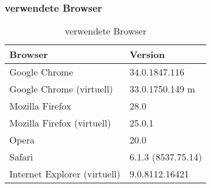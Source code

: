 	\subsubsection{verwendete Browser}	
	\begin{table}[H]
	 \vspace{-20pt}
 		\centering
			\begin{tabular}{| p{8cm} | p{4cm}  |}
			\hline
				Browser		 	&	Version	\\
			\hline

			\hline
				Google Chrome			&	34.0.1847.116\\
				Google Chrome (virtuell)		&	33.0.1750.149 m\\
				Mozilla Firefox				&	28.0\\
				Mozilla Firefox (virtuell)		&	25.0.1\\
				Opera					&	20.0\\
				Safari					&	6.1.3 (8537.75.14)\\
				Internet Explorer (virtuell)		&	9.0.8112.16421\\
				\hline
				\end{tabular}
			\caption{verwendete Browser}
	\end{table}


	
	
	
